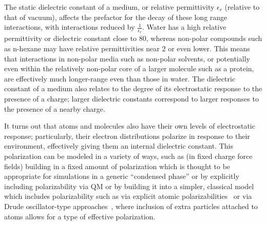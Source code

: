 \documentclass[9pt,bestpractices]{livecoms}
\begin{document}
The static dielectric constant of a medium, or relative permittivity $\epsilon_r$ (relative to that of vacuum), affects the prefactor for the decay of these long range interactions, with interactions reduced by $\frac{1}{\epsilon_r}$.
Water has a high relative permittivity or dielectric constant close to 80, whereas non-polar compounds such as n-hexane may have relative permittivities near 2 or even lower.
This means that interactions in non-polar media such as non-polar solvents, or potentially even within the relatively non-polar core of a larger molecule such as a protein, are effectively much longer-range even than those in water.
The dielectric constant of a medium also relates to the degree of its electrostatic response to the presence of a charge; larger dielectric constants correspond to larger responses to the presence of a nearby charge.

It turns out that atoms and molecules also have their own levels of electrostatic response; particularly, their electron distributions polarize in response to their environment, effectively giving them an internal dielectric constant.
This polarization can be modeled in a variety of ways, such as (in fixed charge force fields) building in a fixed amount of polarization which is thought to be appropriate for simulations in a generic ``condensed phase'' or by explicitly including polarizability via QM or by building it into a simpler, classical model which includes polarizability such as via explicit atomic polarizabilities~\cite{Ponder2003, Ponder:2010:JPhysChemB} or via Drude oscillator-type approaches~\cite{Lemkul:2016:ChemRev}, where inclusion of extra particles attached to atoms allows for a type of effective polarization.
\end{document}
